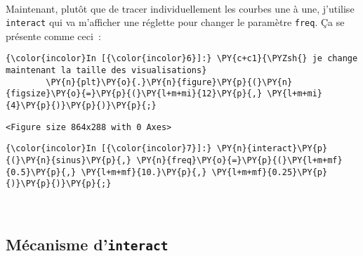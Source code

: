     \begin{center}
    \end{center}
    { \hspace*{\fill} \\}
    
    Maintenant, plutôt que de tracer individuellement les courbes une à une,
j'utilise \texttt{interact} qui va m'afficher une réglette pour changer
le paramètre \texttt{freq}. Ça se présente comme ceci~:

    \begin{Verbatim}[commandchars=\\\{\},frame=single,framerule=0.3mm,rulecolor=\color{cellframecolor}]
{\color{incolor}In [{\color{incolor}6}]:} \PY{c+c1}{\PYZsh{} je change maintenant la taille des visualisations}
        \PY{n}{plt}\PY{o}{.}\PY{n}{figure}\PY{p}{(}\PY{n}{figsize}\PY{o}{=}\PY{p}{(}\PY{l+m+mi}{12}\PY{p}{,} \PY{l+m+mi}{4}\PY{p}{)}\PY{p}{)}\PY{p}{;}
\end{Verbatim}


    
    \begin{verbatim}
<Figure size 864x288 with 0 Axes>
    \end{verbatim}

    
    \begin{Verbatim}[commandchars=\\\{\},frame=single,framerule=0.3mm,rulecolor=\color{cellframecolor}]
{\color{incolor}In [{\color{incolor}7}]:} \PY{n}{interact}\PY{p}{(}\PY{n}{sinus}\PY{p}{,} \PY{n}{freq}\PY{o}{=}\PY{p}{(}\PY{l+m+mf}{0.5}\PY{p}{,} \PY{l+m+mf}{10.}\PY{p}{,} \PY{l+m+mf}{0.25}\PY{p}{)}\PY{p}{)}\PY{p}{;}
\end{Verbatim}


    \begin{center}
    \end{center}
    { \hspace*{\fill} \\}
    
    \hypertarget{muxe9canisme-dinteract}{%
\subsection{\texorpdfstring{Mécanisme
d'\texttt{interact}}{Mécanisme d'interact}}\label{muxe9canisme-dinteract}}

